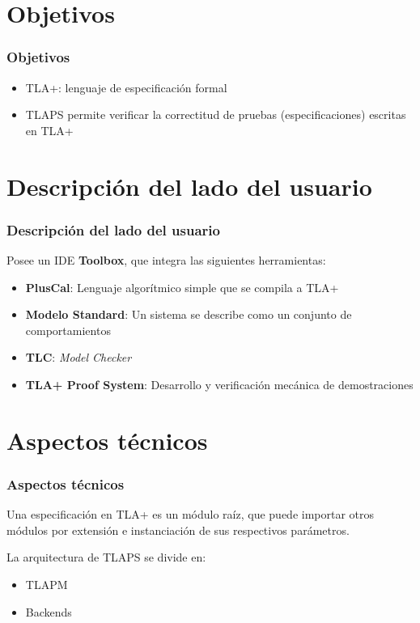 \documentclass[12pt,center]{beamer}
\newenvironment{stepitemize}{\begin{itemize}[<+->]}{\end{itemize} }
\begin{document}
\section{Objetivos}
\begin{frame}
\frametitle{Objetivos}
\begin{stepitemize}
  \item TLA+: lenguaje de especificación formal
  \item TLAPS permite verificar la correctitud de pruebas (especificaciones) escritas en TLA+
\end{stepitemize}
\end{frame}


\section[Descripción]{Descripción del lado del usuario}
\begin{frame}
  \frametitle{Descripción del lado del usuario}
    Posee un IDE \textbf{Toolbox}, que integra las siguientes herramientas:
      \begin{stepitemize}
	\item \textbf{PlusCal}: Lenguaje algorítmico simple que se compila a TLA+
	\item \textbf{Modelo Standard}: Un sistema se describe como un conjunto de comportamientos
	\item \textbf{TLC}: \textit{Model Checker}
	\item \textbf{TLA+ Proof System}: Desarrollo y verificación mecánica de demostraciones
      \end{stepitemize}

\end{frame}


\section{Aspectos técnicos}
\begin{frame}
\frametitle{Aspectos técnicos}
  Una especificación en TLA+ es un módulo raíz, que puede importar otros módulos por extensión e instanciación de sus respectivos parámetros.
  
  La arquitectura de TLAPS se divide en:
  \begin{itemize}
    \item TLAPM
    \item Backends
  \end{itemize}

\end{frame}
\end{document}
